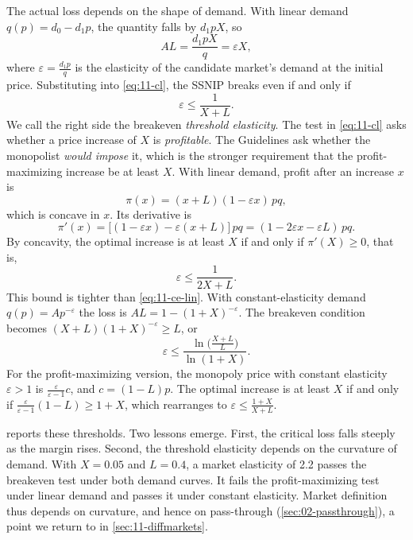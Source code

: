 The actual loss depends on the shape of demand. With linear demand $q(p) = d_0 - d_1 p$, the quantity
falls by $d_1 pX$, so
\begin{equation*}
\mathit{AL} = \frac{d_1 pX}{q} = \varepsilon X,
\end{equation*}
where $\varepsilon = \frac{d_1 p}{q}$ is the elasticity of the candidate market's demand at the initial
price. Substituting into \eqref{eq:11-cl}, the SSNIP breaks even if and only if
\begin{equation}\label{eq:11-ce-lin}
\varepsilon \le \frac{1}{X + L}.
\end{equation}
We call the right side the breakeven \emph{threshold elasticity}. The test in \eqref{eq:11-cl} asks whether a price increase of $X$ is \emph{profitable}. The Guidelines ask whether
the monopolist \emph{would impose} it, which is the stronger requirement that the profit-maximizing increase be
at least $X$. With linear demand, profit after an increase $x$ is
\begin{equation*}
\pi(x) = (x + L)(1 - \varepsilon x)\,pq,
\end{equation*}
which is concave in $x$. Its derivative is
\begin{equation*}
\pi'(x) = \big[(1 - \varepsilon x) - \varepsilon (x + L)\big]\,pq = (1 - 2\varepsilon x - \varepsilon L)\,pq.
\end{equation*}
By concavity, the optimal increase is at least $X$ if and only if $\pi'(X) \ge 0$, that is,
\begin{equation}\label{eq:11-ce-lin-pm}
\varepsilon \le \frac{1}{2X + L}.
\end{equation}
This bound is tighter than \eqref{eq:11-ce-lin}. With constant-elasticity demand $q(p) = A p^{-\varepsilon}$ the
loss is $\mathit{AL} = 1 - (1 + X)^{-\varepsilon}$. The breakeven condition becomes
$(X + L)(1 + X)^{-\varepsilon} \ge L$, or
\begin{equation*}
\varepsilon \le \frac{\ln\!\big(\frac{X + L}{L}\big)}{\ln(1 + X)}.
\end{equation*}
For the profit-maximizing version, the monopoly price with constant elasticity $\varepsilon > 1$ is
$\frac{\varepsilon}{\varepsilon - 1}c$, and $c = (1 - L)p$. The optimal increase is at least $X$ if and only if
$\frac{\varepsilon}{\varepsilon - 1}(1 - L) \ge 1 + X$, which rearranges to
$\varepsilon \le \frac{1 + X}{X + L}$.

 reports these thresholds. Two lessons emerge. First, the critical loss falls steeply as the
margin rises. Second, the threshold elasticity depends on the curvature of demand. With $X = 0.05$ and $L = 0.4$, a
market elasticity of 2.2 passes the breakeven test under both demand curves. It fails the profit-maximizing test
under linear demand and passes it under constant elasticity. Market definition thus depends on curvature, and
hence on pass-through (\cref{sec:02-passthrough}), a point we return to in \cref{sec:11-diffmarkets}.

